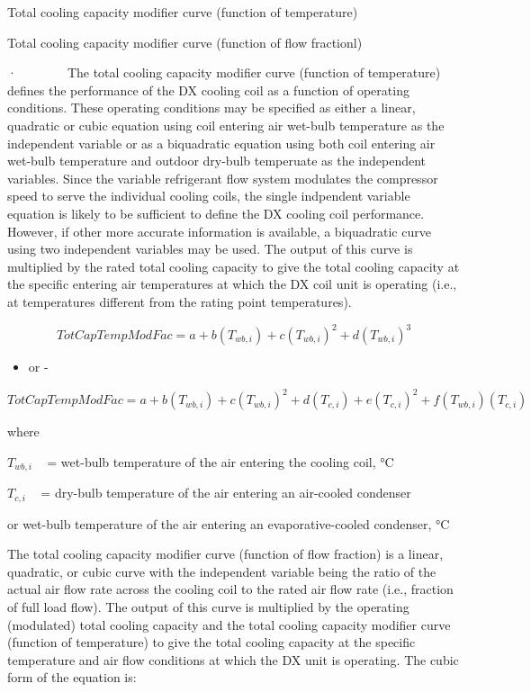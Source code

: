 Total cooling capacity modifier curve (function of temperature)

Total cooling capacity modifier curve (function of flow fractionl)

·~~~~~~~~The total cooling capacity modifier curve (function of temperature) defines the performance of the DX cooling coil as a function of operating conditions. These operating conditions may be specified as either a linear, quadratic or cubic equation using coil entering air wet-bulb temperature as the independent variable or as a biquadratic equation using both coil entering air wet-bulb temperature and outdoor dry-bulb temperuate as the independent variables. Since the variable refrigerant flow system modulates the compressor speed to serve the individual cooling coils, the single indpendent variable equation is likely to be sufficient to define the DX cooling coil performance. However, if other more accurate information is available, a biquadratic curve using two independent variables may be used. The output of this curve is multiplied by the rated total cooling capacity to give the total cooling capacity at the specific entering air temperatures at which the DX coil unit is operating (i.e., at temperatures different from the rating point temperatures).

\begin{equation}
TotCapTempModFac = a + b\left( {{T_{wb,i}}} \right) + c{\left( {{T_{wb,i}}} \right)^2} + d{\left( {{T_{wb,i}}} \right)^3}
\end{equation}

\begin{itemize}
\tightlist
\item
  or -
\end{itemize}

\begin{equation}
TotCapTempModFac = a + b\left( {{T_{wb,i}}} \right) + c{\left( {{T_{wb,i}}} \right)^2} + d\left( {{T_{c,i}}} \right) + e{\left( {{T_{c,i}}} \right)^2} + f\left( {{T_{wb,i}}} \right)\left( {{T_{c,i}}} \right)
\end{equation}

where

\({{T_{wb,i}}}\) ~ = wet-bulb temperature of the air entering the cooling coil, °C

\({{T_{c,i}}}\) ~ = dry-bulb temperature of the air entering an air-cooled condenser

or wet-bulb temperature of the air entering an evaporative-cooled condenser, °C

The total cooling capacity modifier curve (function of flow fraction) is a linear, quadratic, or cubic curve with the independent variable being the ratio of the actual air flow rate across the cooling coil to the rated air flow rate (i.e., fraction of full load flow). The output of this curve is multiplied by the operating (modulated) total cooling capacity and the total cooling capacity modifier curve (function of temperature) to give the total cooling capacity at the specific temperature and air flow conditions at which the DX unit is operating. The cubic form of the equation is:

